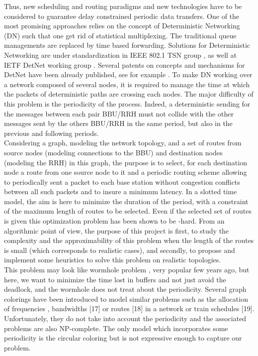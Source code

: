 \documentclass[a4paper,10pt]{article}
\begin{document}
 Thus, new scheduling and routing paradigms and new technologies have to be considered to  guarantee  delay constrained periodic data transfers. One of the most promising approaches relies on the concept of Deterministic Networking (DN) such that one get rid of
 statistical multiplexing. The traditional queue managements are replaced by time based forwarding. Solutions for Deterministic
 Networking are under standardization in IEEE 802.1 TSN group \cite{finn-detnet-architecture-08}, as well at IETF DetNet working group \cite{ieee802}. Several patents on concepts and mechanisms for DetNet have been already published, see for example \cite{howe2005time,leclerc2016transmission}. To make DN working over a
 network composed of several nodes, it is required to manage the time at which the packets of deterministic paths are crossing each nodes. The major difficulty of this problem is the periodicity of the process. Indeed, a deterministic sending for the messages
between each pair BBU/RRH must not collide with the other messages sent by the others BBU/RRH in the same period, but also in the previous
and following periods.\\

Considering a graph, modeling the network topology, and a set of routes from source nodes (modeling connections to the BBU) and destination nodes (modeling the RRH) in this graph, the purpose is to select, for each destination node a route from one source node to it and a periodic routing scheme allowing to periodically sent a packet to each base station without congestion conflicts between all such packets and to insure a minimum latency. In a slotted time model, the aim is here to minimize the duration of the period, with a constraint of the maximum length of routes to be
selected. Even if the selected set of routes is given this optimization problem has been shown to be  \NP-hard. From an algorithmic point of view,
the purpose of this project is first, to study the complexity and the approximability of this problem when the length of the routes is small
(which corresponds to realistic cases), and secondly, to propose and implement some heuristics to solve this problem on realistic topologies.\\


This problem may look like wormhole problem \cite{cole1996benefit}, very popular few years ago, but here, we want to minimize the time lost in buffers and not just avoid the deadlock, and the wormhole does not treat about the periodicity. Several graph colorings have been introduced to model similar problems such as the allocation of frequencies \cite{borndorfer1998frequency}, bandwidths \cite{erlebach2001complexity}[17] or routes \cite{cole1996benefit}[18] in a network or train schedules \cite{strotmann2007railway}[19]. Unfortunately, they do not take into account the periodicity and the associated problems are also NP-complete. The only model which incorporates some periodicity is the circular coloring \cite{zhou2013multiple, zhu2001circular,zhu2006recent}but is not expressive enough to capture our problem.
\end{document}

